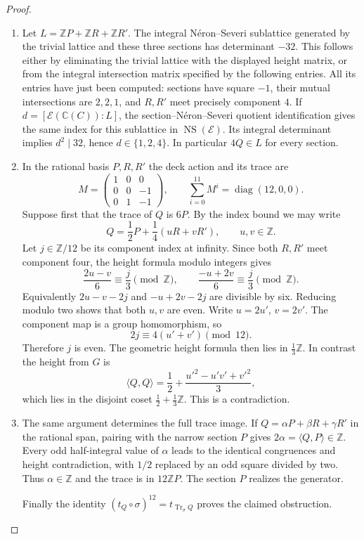 \begin{proof}
\begin{enumerate}[label=\arabic*.,leftmargin=*]
\item Let $L=\mathbb ZP+\mathbb ZR+\mathbb ZR'$.
The integral N\'eron--Severi sublattice
generated by the trivial lattice and
these three sections has determinant
$-32$. This follows either by eliminating
the trivial lattice with the displayed
height matrix, or from the integral
intersection matrix specified by the following entries.
All its entries have just been computed:
sections have square $-1$, their mutual
intersections are $2,2,1$, and $R,R'$
meet precisely component $4$.
If $d=[\mathscr E(\mathbb C(C)):L]$,
the section--N\'eron--Severi quotient
identification gives the same index
for this sublattice in
$\operatorname{NS}(\mathscr E)$.
Its integral determinant implies
$d^2\mid32$, hence $d\in\{1,2,4\}$.
In particular $4Q\in L$ for every section.

\item In the rational basis $P,R,R'$ the
deck action and its trace are
\[
 M=\begin{pmatrix}1&0&0\\0&0&-1\\0&1&-1\end{pmatrix},
 \qquad \sum_{i=0}^{11}M^i=
       \operatorname{diag}(12,0,0).
\]
Suppose first that the trace of $Q$ is
$6P$. By the index bound we may write
\[
 Q=\frac12P+\frac14(uR+vR'),\qquad u,v\in\mathbb Z.
\]
Let $j\in\mathbb Z/12$ be its component
index at infinity. Since both $R,R'$
meet component four, the height formula
modulo integers gives
\[
 \frac{2u-v}{6}\equiv\frac j3\pmod{\mathbb Z},
 \qquad
 \frac{-u+2v}{6}\equiv\frac j3\pmod{\mathbb Z}.
\]
Equivalently $2u-v-2j$ and $-u+2v-2j$
are divisible by six. Reducing modulo
two shows that both $u,v$ are even.
Write $u=2u'$, $v=2v'$. The component
map is a group homomorphism, so
\[
 2j\equiv4(u'+v')\pmod{12}.
\]
Therefore $j$ is even. The geometric
height formula then lies in
$\tfrac13\mathbb Z$. In contrast the
height from $G$ is
\[
 \langle Q,Q\rangle
 =\frac12+\frac{u'^2-u'v'+v'^2}{3},
\]
which lies in the disjoint coset
$\tfrac12+\tfrac13\mathbb Z$.
This is a contradiction.

\item The same argument determines the full
trace image. If $Q=\alpha P+\beta R+\gamma R'$
in the rational span, pairing with the
narrow section $P$ gives
$2\alpha=\langle Q,P\rangle\in\mathbb Z$.
Every odd half-integral value of $\alpha$
leads to the identical congruences and
height contradiction, with $1/2$
replaced by an odd square divided by
two. Thus $\alpha\in\mathbb Z$ and
the trace is in $12\mathbb ZP$.
The section $P$ realizes the generator.

Finally the identity
$(t_Q\circ\sigma)^{12}=t_{\operatorname{Tr}_\sigma Q}$
proves the claimed obstruction.
\end{enumerate}
\end{proof}
